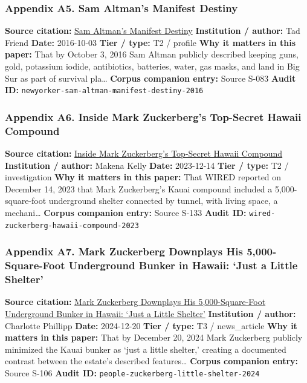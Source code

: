 \documentclass[
  american,
  11pt,
  letterpaper,
]{article}
\begin{document}
\subsubsection{Appendix A5. Sam Altman's Manifest
Destiny}\label{appendix-a5-sam-altman-s-manifest-destiny}

\textbf{Source citation:}
\href{https://www.newyorker.com/magazine/2016/10/10/sam-altmans-manifest-destiny}{Sam
Altman's Manifest Destiny} \textbf{Institution / author:} Tad Friend
\textbf{Date:} 2016-10-03 \textbf{Tier / type:} T2 / profile \textbf{Why
it matters in this paper:} That by October 3, 2016 Sam Altman publicly
described keeping guns, gold, potassium iodide, antibiotics, batteries,
water, gas masks, and land in Big Sur as part of survival pla\ldots{}
\textbf{Corpus companion entry:} Source S-083 \textbf{Audit ID:}
\texttt{newyorker-sam-altman-manifest-destiny-2016}

\subsubsection{Appendix A6. Inside Mark Zuckerberg's Top-Secret Hawaii
Compound}\label{appendix-a6-inside-mark-zuckerbergs-top-secret-hawaii-compound}

\textbf{Source citation:}
\href{https://www.wired.com/story/mark-zuckerberg-inside-hawaii-compound}{Inside
Mark Zuckerberg's Top-Secret Hawaii Compound} \textbf{Institution /
author:} Makena Kelly \textbf{Date:} 2023-12-14 \textbf{Tier / type:} T2
/ investigation \textbf{Why it matters in this paper:} That WIRED
reported on December 14, 2023 that Mark Zuckerberg's Kauai compound
included a 5,000-square-foot underground shelter connected by tunnel,
with living space, a mechani\ldots{} \textbf{Corpus companion entry:}
Source S-133 \textbf{Audit ID:}
\texttt{wired-zuckerberg-hawaii-compound-2023}

\subsubsection{Appendix A7. Mark Zuckerberg Downplays His
5,000-Square-Foot Underground Bunker in Hawaii: `Just a Little
Shelter'}\label{appendix-a7-mark-zuckerberg-downplays-his-5-000-square-foot-underground-bunker-in-hawaii-just-a-little-shelter}

\textbf{Source citation:}
\href{https://people.com/mark-zuckerberg-hawaii-bunker-5000-square-feet-8765376}{Mark
Zuckerberg Downplays His 5,000-Square-Foot Underground Bunker in Hawaii:
`Just a Little Shelter'} \textbf{Institution / author:} Charlotte
Phillipp \textbf{Date:} 2024-12-20 \textbf{Tier / type:} T3 /
news\_article \textbf{Why it matters in this paper:} That by December
20, 2024 Mark Zuckerberg publicly minimized the Kauai bunker as `just a
little shelter,' creating a documented contrast between the estate's
described features\ldots{} \textbf{Corpus companion entry:} Source S-106
\textbf{Audit ID:} \texttt{people-zuckerberg-little-shelter-2024}
\end{document}
